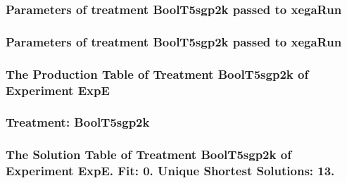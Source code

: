 \documentclass[18pt,c]{beamer}
\begin{document}

 \begin{frame}
 \fontsize{8pt}{9pt}\selectfont
 \frametitle{  Parameters of treatment BoolT5sgp2k passed to xegaRun
 }

 \label{ExpEtParmTable022.tex}  
 \end{frame}


 \begin{frame}
 \fontsize{8pt}{9pt}\selectfont
 \frametitle{  Parameters of treatment BoolT5sgp2k passed to xegaRun
 }

 \label{ExpEtParmTable023.tex}  
 \end{frame}

 \begin{frame}
 \fontsize{8pt}{9pt}\selectfont
 \frametitle{ The Production Table of Treatment BoolT5sgp2k of Experiment ExpE }

 \label{ExpEGrammarTable008.tex}  
 \end{frame}

 \begin{frame}
 \fontsize{8pt}{9pt}\selectfont
 \frametitle{ Treatment: BoolT5sgp2k }

 \label{ExpEStatsTable008.tex}  
 \end{frame}

 \begin{frame}
 \fontsize{8pt}{9pt}\selectfont
 \frametitle{ The Solution Table of Treatment BoolT5sgp2k of Experiment ExpE. Fit: 0. Unique Shortest Solutions: 13. }

 \label{ExpESolutionTable005.tex}  
 \end{frame}
\end{document}
